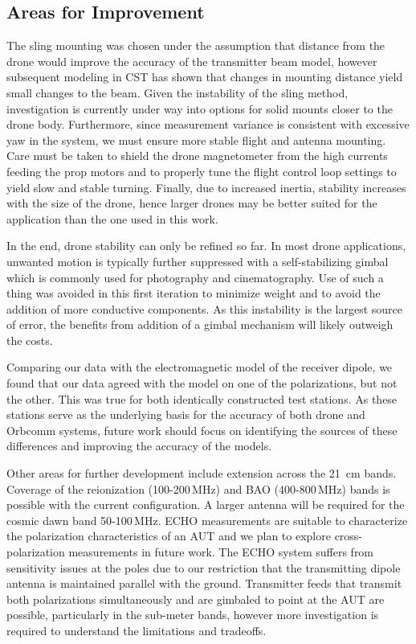 \documentclass[preprint2,numberedappendix,tighten,twocolappendix]{aastex6}
\begin{document}
\subsection{Areas for Improvement}

The sling mounting was chosen under the assumption that distance from the drone would improve the accuracy of the transmitter beam model, however subsequent modeling in CST has shown that changes in mounting distance yield small changes to the beam.  Given the instability of the sling method, investigation is currently under way into options for solid mounts closer to the drone body.  Furthermore, since measurement variance is consistent with excessive yaw in the system, we must ensure more stable flight and antenna mounting. Care must be taken to shield the drone magnetometer from the high currents feeding the prop motors and to properly tune the flight control loop settings to yield slow and stable turning.   Finally, due to increased inertia, stability increases with the size of the drone, hence larger drones may be better suited for the application than the one used in this work.

In the end, drone stability can only be refined so far. In most drone applications, unwanted motion is typically further suppressed with a self-stabilizing gimbal which is commonly used for photography and cinematography. Use of such a thing was avoided in this first iteration to minimize weight and to avoid the addition of more conductive components. As this instability is the largest source of error, the benefits from addition of a gimbal mechanism will likely outweigh the costs. 

Comparing our data with the electromagnetic model of the receiver dipole, we found that our data agreed with the model on one of the polarizations, but not the other.  This was true for both identically constructed test stations. As these stations serve as the underlying basis for the accuracy of both drone and Orbcomm systems, future work should focus on identifying the sources of these differences and improving the accuracy of the models.

Other areas for further development include extension across the 21~cm bands. Coverage of the reionization (100-200\,MHz) and BAO (400-800\,MHz) bands is possible with the current configuration. A larger antenna will be required for the cosmic dawn band 50-100\,MHz.  ECHO measurements are suitable to characterize the polarization characteristics of an AUT and we plan to explore cross-polarization measurements in future work.   The ECHO system  suffers from sensitivity issues at the poles due to our restriction that the transmitting dipole antenna is maintained parallel with the ground. Transmitter feeds that transmit both polarizations simultaneously and are gimbaled to point at the AUT are possible, particularly in the sub-meter bands, however more investigation is required to understand the limitations and tradeoffs.
\end{document}
